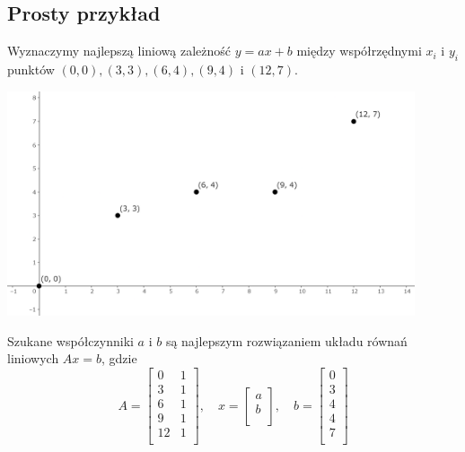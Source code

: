 \documentclass[a4paper,12pt]{article}
\begin{document}
\subsection{Prosty przykład}
Wyznaczymy najlepszą liniową zależność \(y = ax + b\) między współrzędnymi \(x_i\) i \(y_i\) punktów \((0,0), (3,3), (6,4), (9,4)\) i \((12,7)\). 
\begin{center}
	\includegraphics[width=0.9\textwidth]{Figures/figure-2.png}
\end{center} 

\newpage

Szukane współczynniki \(a\) i \(b\) są najlepszym rozwiązaniem układu równań liniowych \(Ax = b\), gdzie
\[
	A = 
	\begin{bmatrix}
		0 &  1 \\
		3 &  1 \\
		6 &  1 \\
		9 &  1 \\
		12 &  1 \\
	\end{bmatrix}
	,\quad
	x = 
	\begin{bmatrix}
		 a \\
		 b \\
	\end{bmatrix}
	,\quad
	b = 
	\begin{bmatrix}
		 0 \\
		 3 \\
		 4 \\
		 4 \\
		 7 \\
	\end{bmatrix}
\]
\end{document}
